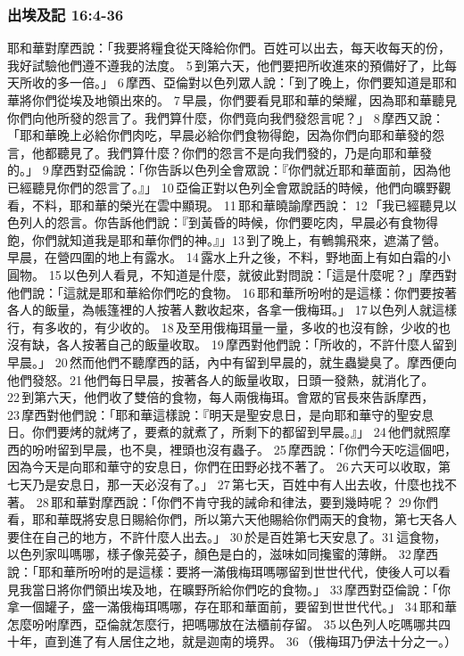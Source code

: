 \subsubsection{出埃及記 16:4-36}
耶和華對摩西說：「我要將糧食從天降給你們。百姓可以出去，每天收每天的份，我好試驗他們遵不遵我的法度。 5 到第六天，他們要把所收進來的預備好了，比每天所收的多一倍。」 6 摩西、亞倫對以色列眾人說：「到了晚上，你們要知道是耶和華將你們從埃及地領出來的。 7 早晨，你們要看見耶和華的榮耀，因為耶和華聽見你們向他所發的怨言了。我們算什麼，你們竟向我們發怨言呢？」 8 摩西又說：「耶和華晚上必給你們肉吃，早晨必給你們食物得飽，因為你們向耶和華發的怨言，他都聽見了。我們算什麼？你們的怨言不是向我們發的，乃是向耶和華發的。」 9 摩西對亞倫說：「你告訴以色列全會眾說：『你們就近耶和華面前，因為他已經聽見你們的怨言了。』」 10 亞倫正對以色列全會眾說話的時候，他們向曠野觀看，不料，耶和華的榮光在雲中顯現。 11 耶和華曉諭摩西說： 12 「我已經聽見以色列人的怨言。你告訴他們說：『到黃昏的時候，你們要吃肉，早晨必有食物得飽，你們就知道我是耶和華你們的神。』」13 到了晚上，有鵪鶉飛來，遮滿了營。早晨，在營四圍的地上有露水。 14 露水上升之後，不料，野地面上有如白霜的小圓物。 15 以色列人看見，不知道是什麼，就彼此對問說：「這是什麼呢？」摩西對他們說：「這就是耶和華給你們吃的食物。 16 耶和華所吩咐的是這樣：你們要按著各人的飯量，為帳篷裡的人按著人數收起來，各拿一俄梅珥。」 17 以色列人就這樣行，有多收的，有少收的。 18 及至用俄梅珥量一量，多收的也沒有餘，少收的也沒有缺，各人按著自己的飯量收取。 19 摩西對他們說：「所收的，不許什麼人留到早晨。」 20 然而他們不聽摩西的話，內中有留到早晨的，就生蟲變臭了。摩西便向他們發怒。21 他們每日早晨，按著各人的飯量收取，日頭一發熱，就消化了。 22 到第六天，他們收了雙倍的食物，每人兩俄梅珥。會眾的官長來告訴摩西， 23 摩西對他們說：「耶和華這樣說：『明天是聖安息日，是向耶和華守的聖安息日。你們要烤的就烤了，要煮的就煮了，所剩下的都留到早晨。』」 24 他們就照摩西的吩咐留到早晨，也不臭，裡頭也沒有蟲子。 25 摩西說：「你們今天吃這個吧，因為今天是向耶和華守的安息日，你們在田野必找不著了。 26 六天可以收取，第七天乃是安息日，那一天必沒有了。」 27 第七天，百姓中有人出去收，什麼也找不著。 28 耶和華對摩西說：「你們不肯守我的誡命和律法，要到幾時呢？ 29 你們看，耶和華既將安息日賜給你們，所以第六天他賜給你們兩天的食物，第七天各人要住在自己的地方，不許什麼人出去。」 30 於是百姓第七天安息了。31 這食物，以色列家叫嗎哪，樣子像芫荽子，顏色是白的，滋味如同攙蜜的薄餅。 32 摩西說：「耶和華所吩咐的是這樣：要將一滿俄梅珥嗎哪留到世世代代，使後人可以看見我當日將你們領出埃及地，在曠野所給你們吃的食物。」 33 摩西對亞倫說：「你拿一個罐子，盛一滿俄梅珥嗎哪，存在耶和華面前，要留到世世代代。」 34 耶和華怎麼吩咐摩西，亞倫就怎麼行，把嗎哪放在法櫃前存留。 35 以色列人吃嗎哪共四十年，直到進了有人居住之地，就是迦南的境界。 36 （俄梅珥乃伊法十分之一。）

